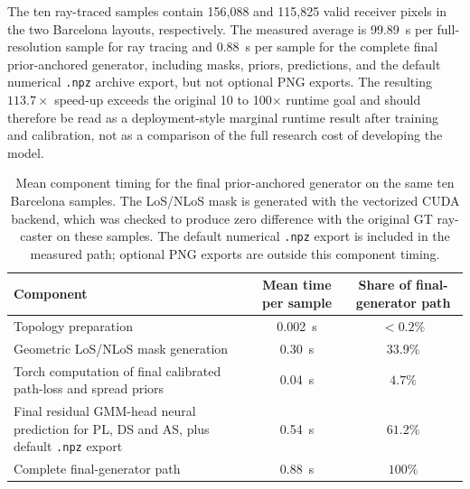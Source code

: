 The ten ray-traced samples contain 156{,}088 and 115{,}825 valid receiver
pixels in the two Barcelona layouts, respectively. The measured average is
\SI{99.89}{s} per full-resolution sample for ray tracing and \SI{0.88}{s} per
sample for the complete final prior-anchored generator, including masks,
priors, predictions, and the default numerical \texttt{.npz} archive export,
but not optional PNG exports. The
resulting \(113.7\times\) speed-up exceeds the original 10 to 100\(\times\)
runtime goal and should therefore be read as a
deployment-style marginal runtime result after training and calibration, not as
a comparison of the full research cost of developing the model.

\begin{table}[H]
\centering
\caption[Final-generator runtime component breakdown.]
{Mean component timing for the final prior-anchored generator on the same ten Barcelona
samples. The LoS/NLoS mask is generated with the vectorized CUDA backend,
which was checked to produce zero difference with the original GT ray-caster
on these samples. The default numerical \texttt{.npz} export is included in
the measured path; optional PNG exports are outside this component timing.}
\label{tab:try80_runtime_breakdown}
\scriptsize
\begin{tabularx}{\textwidth}{>{\raggedright\arraybackslash}Xcc}
\toprule
Component & Mean time per sample & Share of final-generator path \\
\midrule
Topology preparation & \SI{0.002}{s} & \(<0.2\%\) \\
Geometric LoS/NLoS mask generation & \SI{0.30}{s} & \(33.9\%\) \\
Torch computation of final calibrated path-loss and spread priors & \SI{0.04}{s} & \(4.7\%\) \\
Final residual GMM-head neural prediction for PL, DS and AS, plus default \texttt{.npz} export & \SI{0.54}{s} & \(61.2\%\) \\
\midrule
Complete final-generator path & \SI{0.88}{s} & \(100\%\) \\
\bottomrule
\end{tabularx}
\end{table}
\normalsize

